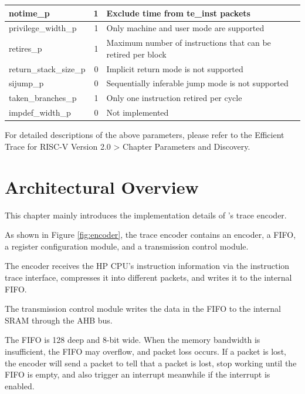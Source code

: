 \documentclass[main\_\_EN.tex]{subfiles}
\begin{document}
\begin{longtable}[c]{ |l|r|l| }
    notime\_p & 1 & Exclude time from te\_inst packets \\\hline
    privilege\_width\_p & 1 & Only machine and user mode are supported \\\hline
    retires\_p & 1 & Maximum number of instructions that can be retired per block \\\hline
    return\_stack\_size\_p & 0 & Implicit return mode is not supported \\\hline
    sijump\_p & 0 & Sequentially inferable jump mode is not supported \\\hline
    taken\_branches\_p & 1 & Only one instruction retired per cycle \\\hline
    impdef\_width\_p & 0 & Not implemented \\\hline

 \end{longtable}

For detailed descriptions of the above parameters, please refer to the Efficient Trace for RISC-V Version 2.0 > Chapter Parameters and Discovery.



\section{Architectural Overview}
\label{sec:riscvtracenc-arch-overview}

This chapter mainly introduces the implementation details of \chipname{}'s trace encoder.

As shown in Figure \ref{fig:encoder}, the trace encoder contains an encoder, a FIFO, a register configuration module, and a transmission control module.

The encoder receives the HP CPU's instruction information via the instruction trace interface, compresses it into different packets, and writes it to the internal FIFO.

The transmission control module writes the data in the FIFO to the internal SRAM through the AHB bus.

The FIFO is 128 deep and 8-bit wide. When the memory bandwidth is insufficient, the FIFO may overflow, and packet loss occurs. If a packet is lost, the encoder will send a packet to tell that a packet is lost, stop working until the FIFO is empty, and also trigger an interrupt meanwhile if the interrupt is enabled.


\end{document}
